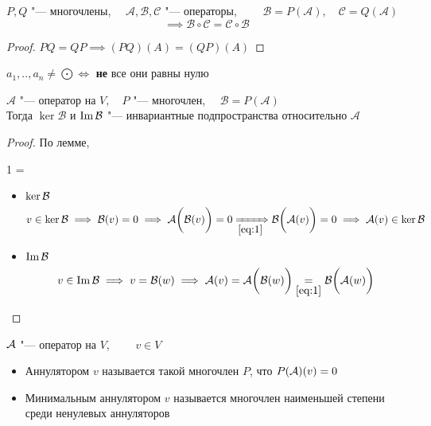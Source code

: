 \begin{implication}
	$ P, Q $ "--- многочлены, $ \quad \mathcal{A}, \mathcal{B}, \mathcal{C} $ "--- операторы, $ \qquad \mathcal{B} = P(\mathcal{A}), \quad \mathcal{C} = Q(\mathcal{A}) $
	$$ \implies \mathcal{B} \circ \mathcal{C} = \mathcal{C} \circ \mathcal{B} $$
\end{implication}

\begin{proof}
	$ PQ = QP \implies (PQ)(A) = (QP)(A) $
\end{proof}

\begin{notation}
	$ a_1, .., a_n \ne \bigodot \iff $ \textbf{не} все они равны нулю
\end{notation}

\begin{theorem}
	$ \mathcal{A} $ "--- оператор на $ V, \quad P $ "--- многочлен, $ \quad \mathcal{B} = P(\mathcal{A}) $ \\
	Тогда $ \ker \mathcal{B} $ и $ \operatorname{Im} \mathcal{B} $ "--- инвариантные подпространства относительно $ \mathcal{A} $
\end{theorem}

\begin{proof}
	По лемме,
	\begin{equ}1
		 \circ \mc{B} =  \circ {}
	\end{equ}
	\begin{itemize}
		\item $ \ker \mathcal{B} $
		$$ v \in \ker \mc{B} \implies \mc{B}(v) = 0 \implies \mc{A} \bigg( \mc{B}(v) \bigg) = 0 \underimp{\eref1} \mc{B} \bigg( \mc{A}(v) \bigg) = 0 \implies \mc{A}(v) \in \ker \mc{B} $$
		\item $ \operatorname{Im} \mathcal{B} $
		$$ v \in \Img \mc{B} \implies v = \mc{B}(w) \implies \mc{A}(v) = \mc{A} \bigg( \mc{B}(w) \bigg) \underset{\eref1}= \mc{B} \bigg( \mc{A}(w) \bigg) $$
	\end{itemize}
\end{proof}

\begin{definition}
	$ \mathcal{A} $ "--- оператор на $ V $, $ \qquad v \in V $
	\begin{itemize}
		\item Аннулятором $ v $ называется такой многочлен $ P $, что $ P(\mathcal{A})(v) = 0 $
		\item Минимальным аннулятором $ v $ называется многочлен наименьшей степени среди ненулевых аннуляторов
	\end{itemize}
\end{definition}

